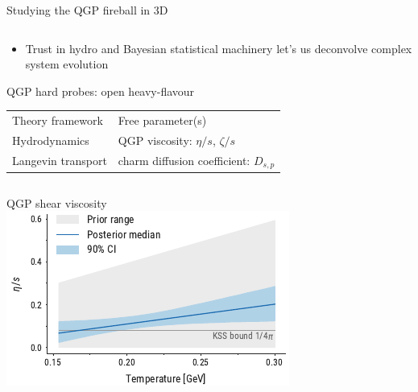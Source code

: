 \documentclass{beamer}
\begin{document}
\begin{frame}{Studying the QGP fireball in 3D}
\begin{columns}
\begin{column}{.6\textwidth}
\begin{center}
      \end{center}
    \end{column}
  \end{columns}
  \begin{itemize}
    \item Trust in hydro and Bayesian statistical machinery let's us deconvolve complex system evolution
  \end{itemize}
\end{frame}

\begin{frame}{QGP hard probes: open heavy-flavour}
  \begin{center}
    \begin{tabular}{ll}
      Theory framework & Free parameter(s)\\
      \noalign{\smallskip}\hline\noalign{\smallskip}
      \small Hydrodynamics & \small QGP viscosity: $\eta/s$, $\zeta/s$\\[.5ex]
      \small Langevin transport & \small charm diffusion coefficient: $D_{s,p}$
  \end{tabular}
  \end{center}
  \vspace{.5cm}
  \begin{columns}[T]
    \begin{column}{.55\textwidth}
      \centering \small QGP shear viscosity\\[.5ex]
      \includegraphics[width=\textwidth]{etas_estimate}
    \end{column}
    \begin{column}{.45\textwidth}

\end{column}
\end{columns}
\end{frame}
\end{document}
